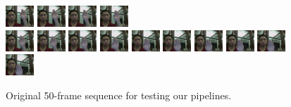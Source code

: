 \documentclass[12pt]{article}
\begin{document}
\begin{figure}[H]
\includegraphics[width=40px, height=30px]{../data/analysis/img0036.jpg}
\includegraphics[width=40px, height=30px]{../data/analysis/img0037.jpg}
\includegraphics[width=40px, height=30px]{../data/analysis/img0038.jpg}
\includegraphics[width=40px, height=30px]{../data/analysis/img0039.jpg} \\
\includegraphics[width=40px, height=30px]{../data/analysis/img0040.jpg}
\includegraphics[width=40px, height=30px]{../data/analysis/img0041.jpg}
\includegraphics[width=40px, height=30px]{../data/analysis/img0042.jpg}
\includegraphics[width=40px, height=30px]{../data/analysis/img0043.jpg}
\includegraphics[width=40px, height=30px]{../data/analysis/img0044.jpg}
\includegraphics[width=40px, height=30px]{../data/analysis/img0045.jpg}
\includegraphics[width=40px, height=30px]{../data/analysis/img0046.jpg}
\includegraphics[width=40px, height=30px]{../data/analysis/img0047.jpg}
\includegraphics[width=40px, height=30px]{../data/analysis/img0048.jpg}
\includegraphics[width=40px, height=30px]{../data/analysis/img0049.jpg}
\caption{Original 50-frame sequence for testing our pipelines.}
\label{seq-original}
\end{figure}
\end{document}
